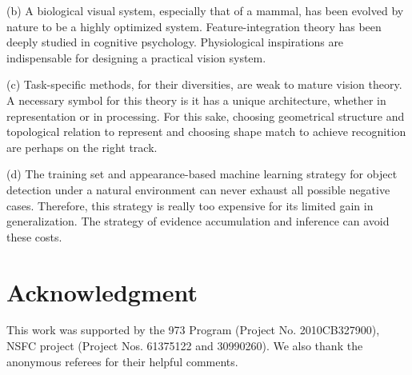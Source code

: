 \documentclass[journal]{IEEEtran}
\begin{document}
(b) A biological visual system, especially that of a mammal, has been evolved by nature to be a highly optimized system. Feature-integration theory has been deeply studied in cognitive psychology. Physiological inspirations are indispensable for designing a practical vision system.

(c) Task-specific methods, for their diversities, are weak to mature vision theory. A necessary symbol for this theory is it has a unique architecture, whether in representation or in processing. For this sake, choosing geometrical structure and topological relation to represent and choosing shape match to achieve recognition are perhaps on the right track.

(d) The training set and appearance-based machine learning strategy for object detection under a natural environment can never exhaust all possible negative cases. Therefore, this strategy is really too expensive for its limited gain in generalization. The strategy of evidence accumulation and inference can avoid these costs.



\section*{Acknowledgment}

This work was supported by the 973 Program (Project No. 2010CB327900), NSFC project (Project Nos. 61375122 and 30990260). We also thank the anonymous referees for their helpful comments.


\ifCLASSOPTIONcaptionsoff
  \newpage
\fi




\end{document}

